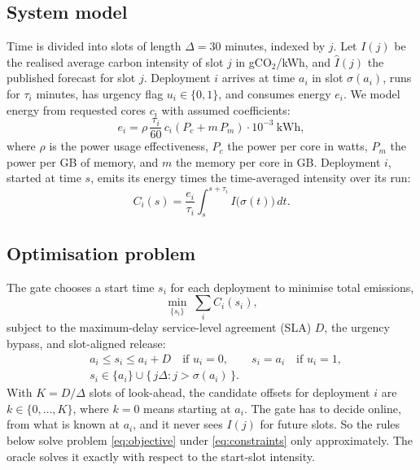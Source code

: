 \documentclass[journal]{IEEEtran}
\begin{document}
\subsection{System model}
Time is divided into slots of length $\Delta = 30$ minutes, indexed by $j$. Let $I(j)$ be the realised average carbon intensity of slot $j$ in gCO$_2$/kWh, and $\hat I(j)$ the published forecast for slot $j$. Deployment $i$ arrives at time $a_i$ in slot $\sigma(a_i)$, runs for $\tau_i$ minutes, has urgency flag $u_i \in \{0,1\}$, and consumes energy $e_i$. We model energy from requested cores $c_i$ with assumed coefficients:
\begin{equation}
e_i = \rho \, \frac{\tau_i}{60} \, c_i \left(P_c + m \, P_m\right) \cdot 10^{-3}\ \text{kWh},
\label{eq:energy}
\end{equation}
where $\rho$ is the power usage effectiveness, $P_c$ the power per core in watts, $P_m$ the power per GB of memory, and $m$ the memory per core in GB. Deployment $i$, started at time $s$, emits its energy times the time-averaged intensity over its run:
\begin{equation}
C_i(s) = \frac{e_i}{\tau_i} \int_{s}^{s+\tau_i} I\big(\sigma(t)\big)\, dt .
\label{eq:emissions}
\end{equation}

\subsection{Optimisation problem}
The gate chooses a start time $s_i$ for each deployment to minimise total emissions,
\begin{equation}
\min_{\{s_i\}} \; \sum_i C_i(s_i),
\label{eq:objective}
\end{equation}
subject to the maximum-delay service-level agreement (SLA) $D$, the urgency bypass, and slot-aligned release:
\begin{equation}
\begin{aligned}
& a_i \le s_i \le a_i + D \quad \text{if } u_i = 0, \qquad s_i = a_i \quad \text{if } u_i = 1,\\
& s_i \in \{a_i\} \cup \{\, j\Delta : j > \sigma(a_i) \,\}.
\end{aligned}
\label{eq:constraints}
\end{equation}
With $K = D/\Delta$ slots of look-ahead, the candidate offsets for deployment $i$ are $k \in \{0, \dots, K\}$, where $k=0$ means starting at $a_i$. The gate has to decide online, from what is known at $a_i$, and it never sees $I(j)$ for future slots. So the rules below solve problem \eqref{eq:objective} under \eqref{eq:constraints} only approximately. The oracle solves it exactly with respect to the start-slot intensity.
\end{document}
